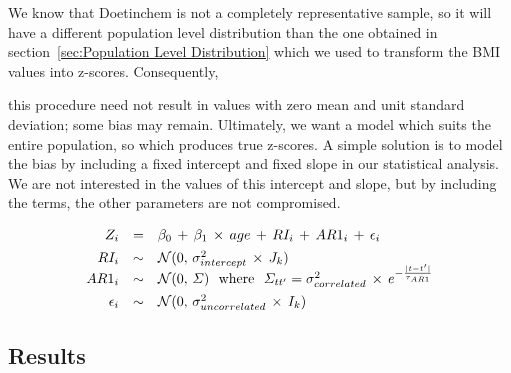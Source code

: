 \documentclass{imammb}
\numberwithin{equation}{section}
\begin{document}

We know that Doetinchem is not a completely representative sample, so it will have a different population level distribution than the one obtained in section~\ref{sec:Population Level Distribution} which we used to transform the BMI values into z-scores. Consequently, 

this procedure need not result in values with zero mean and unit standard deviation; some bias may remain. Ultimately, we want a model which suits the entire population, so which produces true z-scores. A simple solution is to model the bias by including a fixed intercept and fixed slope in our statistical analysis. We are not interested in the values of this intercept and slope, but by including the terms, the other parameters are not compromised.

\begin{equation}
\label{eq:Mixed-Effects Model}
\begin{array}{@{\ }rcl@{\ }}
Z_{i} & = & \beta_0 \, + \, \beta_1 \, \times \, age \, + \, RI_i \, + \, AR1_{i} \, + \, \epsilon_{i}\\[1.5mm]
RI_i & \sim & \mathcal{N}(0, \, \sigma_{intercept}^2 \, \times \, J_k) \\[-0.9mm]
AR1_{i} & \sim & \mathcal{N}(0, \, \Sigma) \ \ \text{where} \ \ \Sigma_{tt'} = \sigma_{correlated}^2 \, \times \, e^{-\frac{|t - t'|}{\tau_{AR1}}}\\[1.5mm]
\epsilon_{i} & \sim & \mathcal{N}(0, \, \sigma_{uncorrelated}^2 \, \times \, I_k)
\end{array}
\end{equation}

\subsection{Results}
\label{sec:Individual Trajectories/Results}
\end{document}
